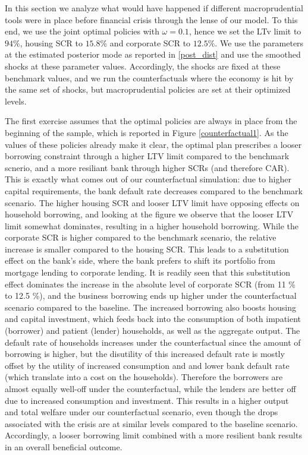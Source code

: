 \documentclass[12pt]{article}
\numberwithin{equation}{section}
\begin{document}
In this section we analyze what would have happened if different macroprudential tools were in place before financial crisis through the lense of our model. To this end, we use the joint optimal policies with $\omega=0.1$, hence we set the LTv limit to $94\%$, housing SCR to $15.8 \%$ and corporate SCR to $12.5 \%$. We use the parameters at the estimated posterior mode as reported in \ref{post_dist} and use the smoothed shocks at these parameter values. Accordingly, the shocks are fixed at these benchmark values, and we run the counterfactuals where the economy is hit by the same set of shocks, but macroprudential policies are set at their optimized levels.

 The first exercise assumes that the optimal policies are always in place from the beginning of the sample, which is reported in Figure \ref{counterfactual1}. As the values of these policies already make it clear, the optimal plan prescribes a looser borrowing constraint through a higher LTV limit compared to the benchmark scnerio, and a more resiliant bank through higher SCRs (and therefore CAR). This is exactly what comes out of our counterfactual simulation: due to higher capital requirements, the bank default rate decreases compared to the benchmark scenario. The higher housing SCR and looser LTV limit have opposing effects on household borrowing, and looking at the figure we observe that the looser LTV limit somewhat dominates, resulting in a higher household borrowing. While the corporate SCR is higher compared to the benchmark scenario, the relative increase is smaller compared to the housing SCR. This leads to a substitution effect on the bank's side, where the bank prefers to shift its portfolio from mortgage lending to corporate lending. It is readily seen that this substitution effect dominates the increase in the absolute level of corporate SCR (from 11 \% to 12.5 \%), and the business borrowing ends up higher under the counterfactual scenario compared to the baseline. The increased borrowing also boosts housing and capital investment, which feeds back into the consumption of both impatient (borrower) and patient (lender) households, as well as the aggregate output. The default rate of households increases under the counterfactual since the amount of borrowing is higher, but the disutility of this increased default rate is mostly offset by the utility of increased consumption and and lower bank default rate (which translate into a cost on the households). Therefore the borrowers are almost equally well-off under the counterfactual, while the lenders are better off due to increased consumption and investment. This results in a higher output and total welfare under our counterfactual scenario, even though the drops associated with the crisis are at similar levels compared to the baseline scenario. Accordingly, a looser borrowing limit combined with a more resilient bank results in an overall beneficial outcome. 
\end{document}

